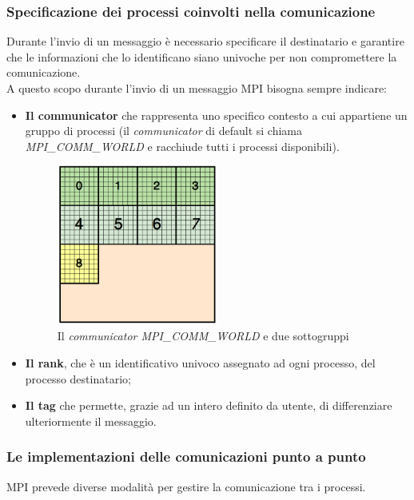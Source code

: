 \subsubsection{Specificazione dei processi coinvolti nella comunicazione}\label{subsec:comm_rank_tag}
Durante l'invio di un messaggio è necessario specificare il destinatario e garantire che le informazioni che lo identificano siano univoche per non compromettere la comunicazione.\\
A questo scopo durante l'invio di un messaggio MPI bisogna sempre indicare:
\begin{itemize}
	\item \textbf{Il communicator} che rappresenta uno specifico contesto a cui appartiene un gruppo di processi (il \textit{communicator} di default si chiama \textit{MPI\_COMM\_WORLD} e racchiude tutti i processi disponibili).
	\begin{figure}[H]
		\centering
		\includegraphics[width=0.5\textwidth]{immagini/block_on_grid.png}
		\caption{Il \textit{communicator MPI\_COMM\_WORLD} e due sottogruppi}
		\label{fig:mpi_communicator}
	\end{figure}
	\item \textbf{Il rank}, che è un identificativo univoco assegnato ad ogni processo, del processo destinatario;
	\item \textbf{Il tag} che permette, grazie ad un intero definito da utente, di differenziare ulteriormente il messaggio.
\end{itemize}

\subsubsection{Le implementazioni delle comunicazioni punto a punto}
MPI prevede diverse modalità per gestire la comunicazione tra i processi.
